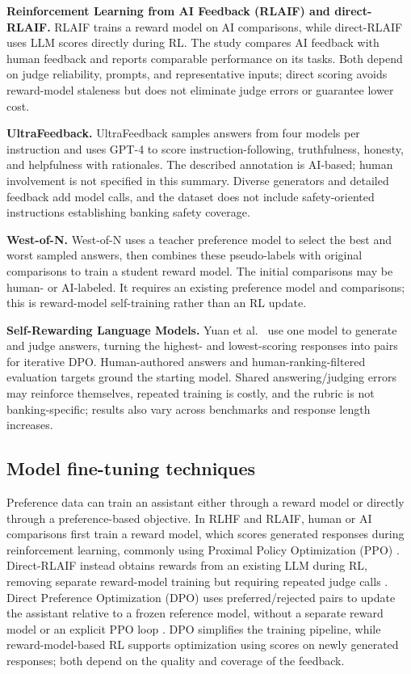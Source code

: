 \documentclass[11pt]{article}
\begin{document}
\noindent\textbf{Reinforcement Learning from AI Feedback (RLAIF) and direct-RLAIF.}
RLAIF \cite{rlaif} trains a reward model on AI comparisons, while direct-RLAIF uses LLM scores directly during RL. The study compares AI feedback with human feedback and reports comparable performance on its tasks. Both depend on judge reliability, prompts, and representative inputs; direct scoring avoids reward-model staleness but does not eliminate judge errors or guarantee lower cost.

\noindent\textbf{UltraFeedback.}
UltraFeedback \cite{ultra} samples answers from four models per instruction and uses GPT-4 to score instruction-following, truthfulness, honesty, and helpfulness with rationales. The described annotation is AI-based; human involvement is not specified in this summary. Diverse generators and detailed feedback add model calls, and the dataset does not include safety-oriented instructions establishing banking safety coverage.

\noindent\textbf{West-of-N.}
West-of-N \cite{west} uses a teacher preference model to select the best and worst sampled answers, then combines these pseudo-labels with original comparisons to train a student reward model. The initial comparisons may be human- or AI-labeled. It requires an existing preference model and comparisons; this is reward-model self-training rather than an RL update.

\noindent\textbf{Self-Rewarding Language Models.}
Yuan et al.\ \cite{selfreward} use one model to generate and judge answers, turning the highest- and lowest-scoring responses into pairs for iterative DPO. Human-authored answers and human-ranking-filtered evaluation targets ground the starting model. Shared answering/judging errors may reinforce themselves, repeated training is costly, and the rubric is not banking-specific; results also vary across benchmarks and response length increases.

\subsection{Model fine-tuning techniques}
Preference data can train an assistant either through a reward model or directly through a preference-based objective. In RLHF and RLAIF, human or AI comparisons first train a reward model, which scores generated responses during reinforcement learning, commonly using Proximal Policy Optimization (PPO) \cite{rlhf,rlaif}. Direct-RLAIF instead obtains rewards from an existing LLM during RL, removing separate reward-model training but requiring repeated judge calls \cite{rlaif}. Direct Preference Optimization (DPO) uses preferred/rejected pairs to update the assistant relative to a frozen reference model, without a separate reward model or an explicit PPO loop \cite{dpo}. DPO simplifies the training pipeline, while reward-model-based RL supports optimization using scores on newly generated responses; both depend on the quality and coverage of the feedback.
\end{document}
